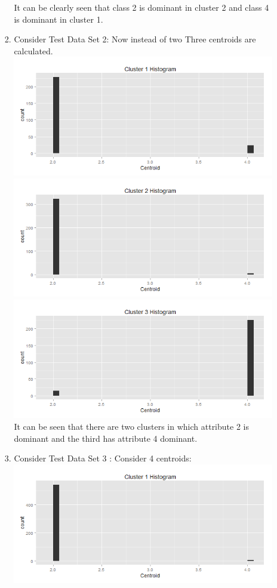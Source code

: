 \documentclass{article}
\begin{document}
\begin{enumerate}
\begin{enumerate}
\begin{enumerate}
It can be clearly seen that class 2 is dominant in cluster 2 and class 4 is dominant in cluster 1.
\item Consider Test Data Set 2: Now instead of two Three centroids are calculated.\\
\includegraphics[scale=0.5]{test2_1.png}\\
\includegraphics[scale=0.5]{test2_2.png}\\
\includegraphics[scale=0.5]{test2_3.png}\\
It can be seen that there are two clusters in which attribute 2 is dominant and the third has attribute 4 dominant.
\item Consider Test Data Set 3 : Consider 4 centroids:\\
\includegraphics[scale=0.5]{test3_1.png}\\

\end{enumerate}
\end{enumerate}
\end{enumerate}
\end{document}
